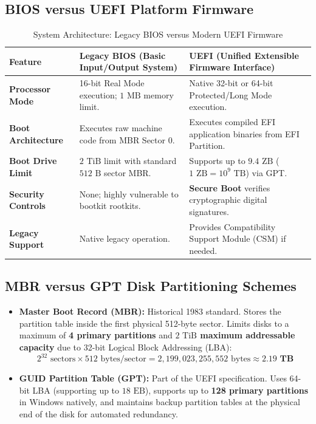 \subsection{BIOS versus UEFI Platform Firmware}
\begin{table}[htbp]
\centering
\small
\caption{System Architecture: Legacy BIOS versus Modern UEFI Firmware}
\label{tab:bios_vs_uefi}
\begin{tabularx}{\textwidth}{l X X}
\toprule
\textbf{Feature} & \textbf{Legacy BIOS (Basic Input/Output System)} & \textbf{UEFI (Unified Extensible Firmware Interface)} \\
\midrule
\textbf{Processor Mode} & 16-bit Real Mode execution; $1\text{ MB}$ memory limit. & Native 32-bit or 64-bit Protected/Long Mode execution. \\
\textbf{Boot Architecture} & Executes raw machine code from MBR Sector 0. & Executes compiled EFI application binaries from EFI Partition. \\
\textbf{Boot Drive Limit} & $2\text{ TiB}$ limit with standard $512\text{ B}$ sector MBR. & Supports up to $9.4\text{ ZB}$ ($1\text{ ZB} = 10^9\text{ TB}$) via GPT. \\
\textbf{Security Controls} & None; highly vulnerable to bootkit rootkits. & \textbf{Secure Boot} verifies cryptographic digital signatures. \\
\textbf{Legacy Support} & Native legacy operation. & Provides Compatibility Support Module (CSM) if needed. \\
\bottomrule
\end{tabularx}
\end{table}

\subsection{MBR versus GPT Disk Partitioning Schemes}
\begin{itemize}
    \item \textbf{Master Boot Record (MBR):} Historical 1983 standard. Stores the partition table inside the first physical 512-byte sector. Limits disks to a maximum of \textbf{4 primary partitions} and \textbf{$2\text{ TiB}$ maximum addressable capacity} due to 32-bit Logical Block Addressing (LBA):
    \[ 2^{32} \text{ sectors} \times 512\text{ bytes/sector} = 2,199,023,255,552\text{ bytes} \approx \mathbf{2.19\text{ TB}} \]
    \item \textbf{GUID Partition Table (GPT):} Part of the UEFI specification. Uses 64-bit LBA (supporting up to $18\text{ EB}$), supports up to \textbf{128 primary partitions} in Windows natively, and maintains backup partition tables at the physical end of the disk for automated redundancy.
\end{itemize}


